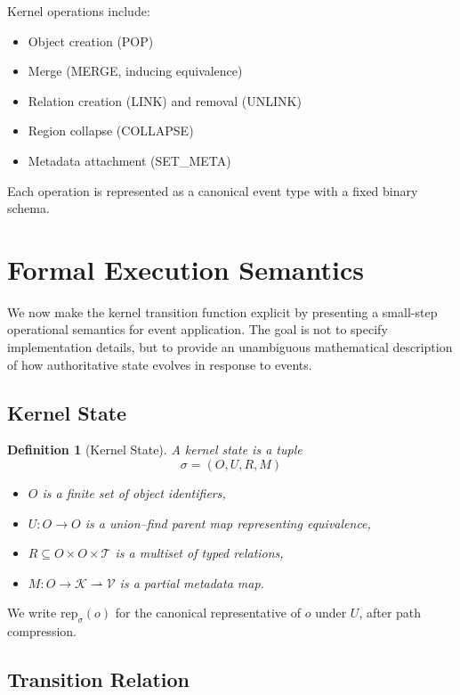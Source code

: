 \documentclass[11pt]{article}
\newtheorem{definition}{Definition}[section]
\begin{document}
Kernel operations include:

\begin{itemize}
\item Object creation (POP)
\item Merge (MERGE, inducing equivalence)
\item Relation creation (LINK) and removal (UNLINK)
\item Region collapse (COLLAPSE)
\item Metadata attachment (SET\_META)
\end{itemize}

Each operation is represented as a canonical event type with a fixed binary schema.

\section{Formal Execution Semantics}

We now make the kernel transition function explicit by presenting a small-step operational semantics for event application. The goal is not to specify implementation details, but to provide an unambiguous mathematical description of how authoritative state evolves in response to events.

\subsection{Kernel State}

\begin{definition}[Kernel State]
\label{def:kernel-state}
A kernel state is a tuple
\[
\sigma = (O, U, R, M)
\]
\begin{itemize}
\item $O$ is a finite set of object identifiers,
\item $U : O \to O$ is a union--find parent map representing equivalence,
\item $R \subseteq O \times O \times \mathcal{T}$ is a multiset of typed relations,
\item $M : O \to \mathcal{K} \rightharpoonup \mathcal{V}$ is a partial metadata map.
\end{itemize}
\end{definition}

We write $\mathrm{rep}_\sigma(o)$ for the canonical representative of $o$ under $U$, after path compression.

\subsection{Transition Relation}
\end{document}
